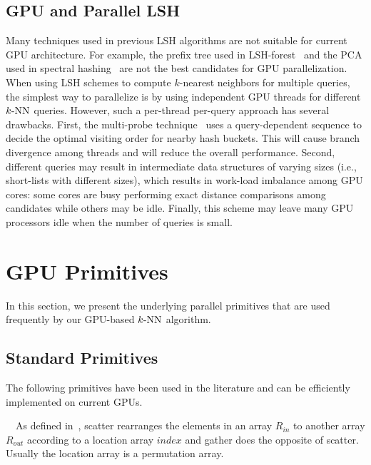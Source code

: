 \subsection{GPU and Parallel LSH}
Many techniques used in previous LSH algorithms are not suitable for current GPU architecture. For example, the prefix tree used in LSH-forest~\cite{Bawa:2005:LFS} and the PCA used in spectral hashing~\cite{weiss:nips:2008} are not the best candidates for GPU parallelization. When using LSH schemes to compute $k$-nearest neighbors for multiple queries, the simplest way to parallelize is by using independent GPU threads for different $k\text{-NN}$ queries.
However, such a per-thread per-query approach has several drawbacks. First, the multi-probe technique~\cite{Lv:2007:MLE} uses a query-dependent sequence to decide the optimal visiting order for nearby hash buckets. This will cause branch divergence among threads and will reduce the overall performance. Second, different queries may result in intermediate data structures of varying sizes (i.e., short-lists with different sizes), which results in work-load imbalance among GPU cores: some cores are busy performing exact distance comparisons among candidates while others may be idle. Finally, this scheme may leave many GPU processors idle when the number of queries is small.

\section{GPU Primitives}
\label{sec:6:primitive}
In this section, we present the underlying parallel primitives that are used frequently by our GPU-based $k\text{-NN}$ algorithm.

\subsection{Standard Primitives}
The following primitives have been used in the literature and can be efficiently implemented on current GPUs.

 \ \ As defined in~\cite{He:2007:EGS}, scatter rearranges the elements in an array $R_{in}$ to another array $R_{out}$ according to a location array $index$ and gather does the opposite of scatter. Usually the location array is a permutation array.

\noindent {}

